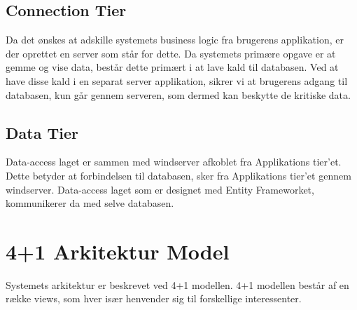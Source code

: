 \subsection{Connection Tier}\label{sec:Connectiontier}
Da det ønskes at adskille systemets business logic fra brugerens applikation, er der oprettet en server som står for dette. Da systemets primære opgave er at gemme og vise data, består dette primært i at lave kald til databasen. Ved at have disse kald i en separat server applikation, sikrer vi at brugerens adgang til databasen, kun går gennem serveren, som dermed kan beskytte de kritiske data.

\subsection{Data Tier}
Data-access laget er sammen med \gls{windserver} afkoblet fra Applikations tier'et. Dette betyder at forbindelsen til databasen, sker fra Applikations tier'et gennem \gls{windserver}. Data-access laget som er designet med Entity Frameworket, kommunikerer da med selve databasen.

\section{4+1 Arkitektur Model}
Systemets arkitektur er beskrevet ved 4+1 modellen. 4+1 modellen består af en række views, som hver især henvender sig til forskellige interessenter.

